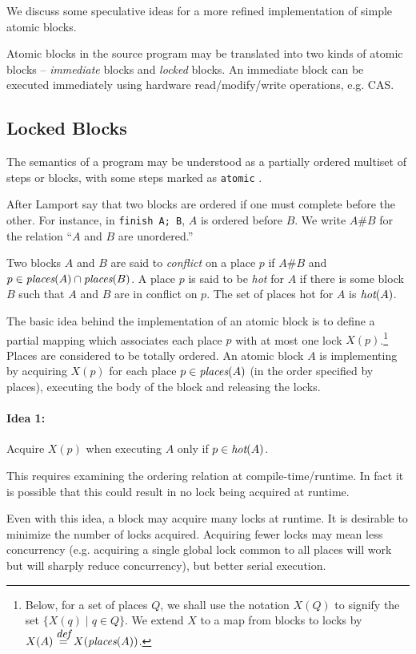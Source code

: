 \documentclass[twocolumn]{article}
\def\places{\mbox{\em places}}
\def\defeq{\stackrel{\mbox{\em def}}{=}}
\def\hot{\mbox{\em hot}}
\def\alt{\;|\;}
\begin{document}
We discuss some speculative ideas for a more refined implementation of
simple atomic blocks.

Atomic blocks in the source program may be translated into two kinds of
atomic blocks -- {\em immediate} blocks and {\em locked} blocks. An immediate
block can be executed immediately using hardware read/modify/write
operations, e.g. CAS. 

\subsection{Locked Blocks}
The semantics of a program may be understood as a partially ordered
multiset of steps or blocks, with some steps marked as {\tt atomic} \cite{rao}.

After Lamport \cite{lamport-order} say that two blocks are ordered if
one must complete before the other. For instance, in {\tt finish {A};
B}, $A$ is ordered before $B$. We write $A \# B$ for the
relation ``$A$ and $B$ are unordered.''

Two blocks $A$ and $B$ are said to {\em conflict} on a place $p$ if $A
\# B$ and $p \in \places(A) \cap \places(B)$. A place $p$ is said to
be {\em hot} for $A$ if there is some block $B$ such that $A$ and $B$ are in
conflict on $p$. The set of places hot for $A$ is $\hot(A)$.

The basic idea behind the implementation of an atomic block is to
define a partial mapping which associates each place $p$ with at most
one lock $X(p)$.\footnote{Below, for a set of places $Q$, we shall use
the notation $X(Q)$ to signify the set $\{X(q) \alt q \in Q\}$.
We extend $X$ to a map from blocks to locks by $X(A)\defeq X(\places(A))$.
}
Places are considered to be totally ordered.  An atomic block $A$ is
implementing by acquiring $X(p)$ for each place $p \in \places(A)$ (in
the order specified by places), executing the body of the block and
releasing the locks.

{}\paragraph{Idea 1:} Acquire $X(p)$ when executing $A$ only if 
$p\in \hot(A)$.

This requires examining the ordering relation at
compile-time/runtime. In fact it is possible that this could result in
no lock being acquired at runtime.

Even with this idea, a block may acquire many locks at runtime. It is
desirable to minimize the number of locks acquired. Acquiring fewer
locks may mean less concurrency (e.g.{} acquiring a single global lock
common to all places will work but will sharply reduce concurrency),
but better serial execution.
\end{document}
